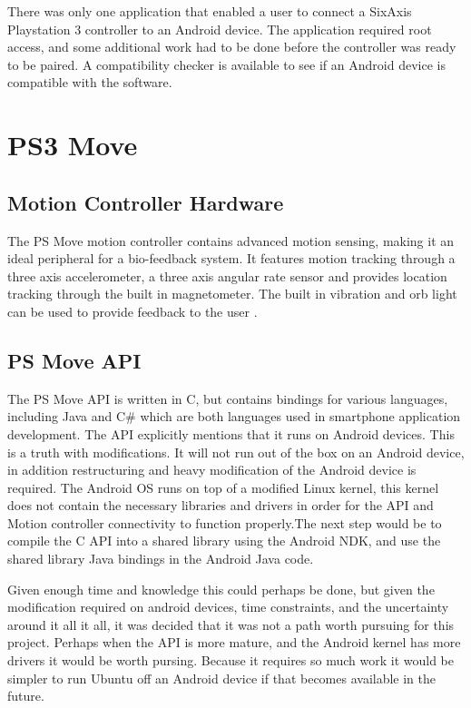There was only one application\cite{sixaxisController} that enabled a user to connect a SixAxis Playstation 3 controller to an Android device. The application required root access, and some additional work had to be done before the controller was ready to be paired. A compatibility checker is available to see if an Android device is compatible with the software.

\section{PS3 Move}

\subsection{Motion Controller Hardware}
The PS Move motion controller contains advanced motion sensing, making it an ideal peripheral for a bio-feedback system. It features motion tracking through a three axis accelerometer, a three axis angular rate sensor and provides location tracking through the built in magnetometer. The built in vibration and orb light can be used to provide feedback to the user \cite{psMoveTech}.

\subsection{PS Move API}
The PS Move API \cite{PSMoveAPI} is written in C, but contains bindings for various languages, including Java and C\# which are both languages used in smartphone application development. The API explicitly mentions that it runs on Android devices. This is a truth with modifications. It will not run out of the box on an Android device, in addition restructuring and heavy modification of the Android device is required. The Android OS runs on top of a modified Linux kernel, this kernel does not contain the necessary libraries and drivers in order for the API and Motion controller connectivity to function properly.The next step would be to compile the C API into a shared library using the Android NDK, and use the shared library Java bindings in the Android Java code.

Given enough time and knowledge this could perhaps be done, but given the modification required on android devices, time constraints, and the uncertainty around it all it all, it was decided that it was not a path worth pursuing for this project. Perhaps when the API is more mature, and the Android kernel has more drivers it would be worth pursing. Because it requires so much work it would be simpler to run Ubuntu off an Android device if that becomes available in the future. \cite{ubuntuAndroid}

